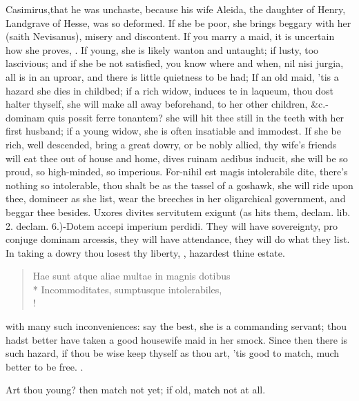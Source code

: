 Casimirus,that he was unchaste, because his wife Aleida, the
daughter of Henry, Landgrave of Hesse, was so deformed. If she be poor,
she brings beggary with her (saith Nevisanus), misery and discontent.
If you marry a maid, it is uncertain how she proves, . If young, she is likely wanton and untaught;
if lusty, too lascivious; and if she be not satisfied, you know where
and when, nil nisi jurgia, all is in an uproar, and there is little
quietness to be had; If an old maid, 'tis a hazard she dies in
childbed; if a rich widow, induces te in laqueum, thou dost
halter thyself, she will make all away beforehand, to her other
children, \&c.-dominam quis possit ferre tonantem? she will hit
thee still in the teeth with her first husband; if a young widow, she
is often insatiable and immodest. If she be rich, well descended, bring
a great dowry, or be nobly allied, thy wife's friends will eat thee out
of house and home, dives ruinam aedibus inducit, she will be so proud,
so high-minded, so imperious. For-nihil est magis intolerabile dite,
there's nothing so intolerable, thou shalt be as the tassel of a
goshawk, she will ride upon thee, domineer as she list, wear the
breeches in her oligarchical government, and beggar thee besides.
Uxores divites servitutem exigunt (as \Seneca{} hits them, declam. lib. 2.
declam. 6.)-Dotem accepi imperium perdidi. They will have sovereignty,
pro conjuge dominam arcessis, they will have attendance, they will do
what they list. In taking a dowry thou losest thy liberty, , hazardest thine estate.
%
\begin{latin}%
\begin{verse}%
Hae sunt atque aliae multae in magnis dotibus\\*
Incommoditates, sumptusque intolerabiles, \etc{}\\!
\end{verse}%
\end{latin}%
%
with many such inconveniences: say the best, she is a commanding
servant; thou hadst better have taken a good housewife maid in her
smock. Since then there is such hazard, if thou be wise keep thyself as
thou art, 'tis good to match, much better to be free.
%
.
%

Art thou young? then match not yet; if old, match not at all.

